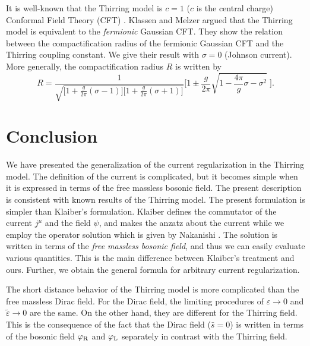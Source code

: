 \documentclass[a4paper,fleqn]{article}
\begin{document}
It is well-known that the Thirring model is $c=1$ ($c$ is the central charge)
 Conformal Field Theory (CFT) \cite{fer_gri_gat72}. Klassen and Melzer \cite{kla_mel93}
argued that the Thirring model is equivalent to the {\it fermionic} Gaussian CFT.
They show the relation between the compactification radius of the fermionic Gaussian CFT 
and the Thirring coupling constant. We give their result with $\sigma=0$ (Johnson current).
More generally, the compactification radius $R$ is written by
\begin{equation}
R = \frac{1}{\sqrt{\biggl[1+ \displaystyle\frac{g}{2 \pi}(\sigma-1)\biggr]
                   \biggl[1+ \displaystyle\frac{g}{2 \pi}(\sigma+1)\biggr]}}\biggl[
      1 \pm \frac{g}{2 \pi} \sqrt{1-\frac{4 \pi}{g} \sigma - \sigma^2} \;\biggr] .
\end{equation}

\newpage
\section{Conclusion}
We have presented the generalization of the current regularization in the Thirring model.
The definition of the current is complicated, 
but it becomes simple when it is expressed in terms of the free massless bosonic field.
The present description is consistent with known results of the Thirring model.
The present formulation is simpler than Klaiber's formulation. 
Klaiber defines the commutator of the current $j^\mu$ and the field $\psi$,
and makes the anzatz about the current while we employ
the operator solution which is given by Nakanishi \cite{nak77}.
 The solution is written in terms of the {\it free massless bosonic field}, and thus
we can easily evaluate various quantities. This is the main difference between Klaiber's
treatment and ours. Further, we obtain the general formula for arbitrary current regularization.

The short distance behavior of the Thirring model is more complicated than the free massless
Dirac field. For the Dirac field, the limiting procedures of $\varepsilon \rightarrow 0$
and $\widetilde\varepsilon \rightarrow 0$ are the same. On the other hand, they are different
for the Thirring field. This is the consequence of the fact that the Dirac
field ($\bar{s} =0$) is written in terms of the bosonic field $\varphi_{\rm R}$ and 
$\varphi_{\rm L}$ separately in contrast with the Thirring field. 
\end{document}
